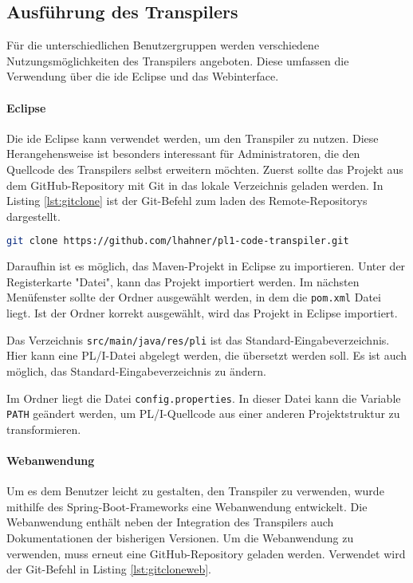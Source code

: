\subsection{Ausführung des Transpilers}

Für die unterschiedlichen Benutzergruppen werden verschiedene Nutzungsmöglichkeiten des Transpilers angeboten. Diese umfassen die Verwendung über die \ac{ide} Eclipse und das Webinterface.

\paragraph*{Eclipse}
Die \ac{ide} Eclipse kann verwendet werden, um den Transpiler zu nutzen. Diese Herangehensweise ist besonders interessant für Administratoren, die den Quellcode des Transpilers selbst erweitern möchten.
Zuerst sollte das Projekt aus dem GitHub-Repository mit Git in das lokale Verzeichnis geladen werden.
In Listing \ref{lst:gitclone} ist der Git-Befehl zum laden des Remote-Repositorys dargestellt. 

\begin{lstlisting}[language=bash, caption=Klonen des Transpiler Repositories, label={lst:gitclone}]
	git clone https://github.com/lhahner/pl1-code-transpiler.git
\end{lstlisting}

Daraufhin ist es möglich, das Maven-Projekt in Eclipse zu importieren. Unter der Registerkarte "Datei", kann das Projekt importiert werden. Im nächsten Menüfenster sollte der Ordner ausgewählt werden, in dem die \verb+pom.xml+ Datei liegt. Ist der Ordner korrekt ausgewählt, wird das Projekt in Eclipse importiert. 

Das Verzeichnis \verb+src/main/java/res/pli+ ist das Standard-Eingabeverzeichnis. Hier kann eine PL/I-Datei abgelegt werden, die übersetzt werden soll. Es ist auch möglich, das Standard-Eingabeverzeichnis zu ändern. 

Im Ordner  liegt die Datei \verb+config.properties+. 
In dieser Datei kann die Variable \verb+PATH+ geändert werden, 
um PL/I-Quellcode aus einer anderen Projektstruktur zu transformieren.

\paragraph*{Webanwendung}
Um es dem Benutzer leicht zu gestalten, den Transpiler zu verwenden, wurde mithilfe des Spring-Boot-Frameworks eine Webanwendung entwickelt.
Die Webanwendung enthält neben der Integration des Transpilers auch Dokumentationen der bisherigen Versionen.
Um die Webanwendung zu verwenden, muss erneut eine GitHub-Repository geladen werden. Verwendet wird der Git-Befehl in Listing
\ref{lst:gitcloneweb}.

